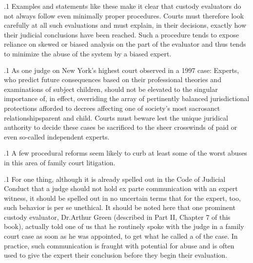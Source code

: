 \documentclass[11pt, twoside]{article}
\begin{document}
{{}%

\p.1{%
Examples and statements like these make it clear that custody evaluators do not always follow even minimally proper procedures. Courts
must therefore look carefully at all such evaluations and must explain,
in their decisions, exactly how their judicial conclusions have been
reach\-ed. Such a procedure tends to expose reliance on skewed or biased analysis on the part of the evaluator and thus tends to minimize the
abuse of the system by a biased expert.
}%

\p.1{%
As one judge on New York’s highest court observed in a 1997 case:
Experts, who predict future consequences based on their professional theories and examinations of subject children, should not
be elevated to the singular importance of, in effect, overriding the
array of pertinently balanced jurisdictional protections afforded to
decrees affecting one of society’s most sacrosanct
relationships\mdash{}parent and child. Courts must beware lest the unique juridical
authority to decide these cases be sacrificed to the sheer crosswinds
of paid or even so-called independent experts.
}%

\p.1{%
A few procedural reforms seem likely to curb at least some of the
worst abuses in this area of family court litigation.
}%

\p.1{%
For one thing, although it is already spelled out in the Code of Judicial Conduct that a judge should not hold ex parte communication with
an expert witness, it should be spelled out in no uncertain terms that for
the expert, too, such behavior is per se unethical. It should be noted here
that one prominent custody evaluator, Dr.\@ Arthur Green (described in
Part II, Chapter 7 of this book), actually told one of us that he routinely
spoke with the judge in a family court case as soon as he was appointed,
to get what he called a  of the case. In practice, such communication is fraught with potential for abuse and is often used to give
the expert their conclusion before they begin their evaluation.
}%

}
\end{document}
